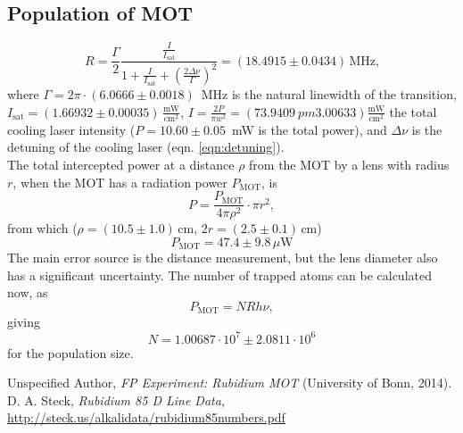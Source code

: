 \documentclass[twocolumn]{article}
\begin{document}
\subsection{Population of MOT}
\begin{equation}
R = \frac{\Gamma}{2} \frac{\frac{I}{I_{\text{sat}}}}{1 + \frac{I}{I_{\text{sat}}} + \left( \frac{2 \Delta \nu}{\Gamma} \right)^2} = (18.4915 \pm 0.0434)\, \text{MHz,}
\end{equation}
where $\Gamma = 2 \pi \cdot (6.0666 \pm 0.0018)$~MHz is the natural linewidth of the transition, $I_{\text{sat}} = (1.66932 \pm 0.00035)\, \frac{\text{mW}}{\text{cm}^2}$, $I = \frac{2 P}{\pi w^2} = (73.9409 \ pm 3.00633) \frac{\text{mW}}{\text{cm}^2}$ the total cooling laser intensity ($P = 10.60 \pm 0.05$~mW is the total power), and $\Delta \nu$ is the detuning of the cooling laser (eqn. \ref{eqn:detuning}).\\
The total intercepted power at a distance $\rho$ from the MOT by a lens with radius $r$, when the MOT has a radiation power $P_{\text{MOT}}$, is 
\begin{equation}
P = \frac{P_{\text{MOT}}}{4 \pi \rho^2} \cdot \pi r^2, \nonumber
\end{equation}
from which ($\rho = (10.5 \pm 1.0) \,$cm, $2r = (2.5\pm 0.1) \,$cm)
\begin{equation}
P_{\text{MOT}} = 47.4 \pm 9.8 \, \text{$\mu$W}
\end{equation}
The main error source is the distance measurement, but the lens diameter also has a significant uncertainty. The number of trapped atoms can be calculated now, as
\begin{equation}
P_{\text{MOT}} = N R h \nu, \nonumber
\end{equation}
giving
\begin{equation}
N = 1.00687\cdot 10^7 \pm 2.0811\cdot 10^6
\end{equation}
for the population size.
\begin{thebibliography}{9}
Unspecified Author, \textsl{FP Experiment: Rubidium MOT} (University of Bonn, 2014).
D. A. Steck, \textsl{Rubidium 85 D Line Data}, \url{http://steck.us/alkalidata/rubidium85numbers.pdf}
\end{thebibliography}
\end{document}
